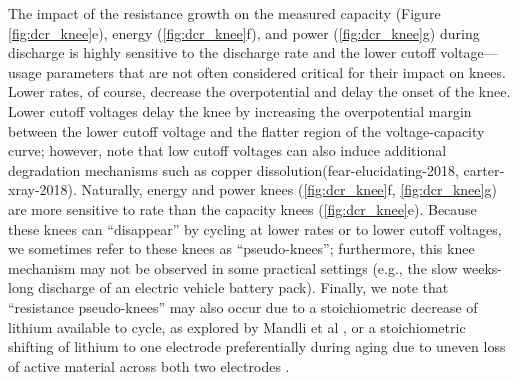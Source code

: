 \documentclass[journal=jpclcd,manuscript=article]{achemso}
\begin{document}
The impact of the resistance growth on the measured capacity (Figure \ref{fig:dcr_knee}e), energy (\ref{fig:dcr_knee}f), and power (\ref{fig:dcr_knee}g) during discharge is highly sensitive to the discharge rate and the lower cutoff voltage---usage parameters that are not often considered critical for their impact on knees. Lower rates, of course, decrease the overpotential and delay the onset of the knee. Lower cutoff voltages delay the knee by increasing the overpotential margin between the lower cutoff voltage and the flatter region of the voltage-capacity curve; however, note that low cutoff voltages can also induce additional degradation mechanisms such as copper dissolution(fear-elucidating-2018, carter-xray-2018). Naturally, energy and power knees (\ref{fig:dcr_knee}f, \ref{fig:dcr_knee}g) are more sensitive to rate than the capacity knees (\ref{fig:dcr_knee}e). Because these knees can ``disappear'' by cycling at lower rates or to lower cutoff voltages, we sometimes refer to these knees as ``pseudo-knees''; furthermore, this knee mechanism may not be observed in some practical settings (e.g., the slow weeks-long discharge of an electric vehicle battery pack).
Finally, we note that ``resistance pseudo-knees'' may also occur due to a stoichiometric decrease of lithium available to cycle, as explored by Mandli et al \cite{mandli_analysis_2019}, or a stoichiometric shifting of lithium to one electrode preferentially during aging due to uneven loss of active material across both two electrodes \cite{lin_comprehensive_2013}.
\end{document}
